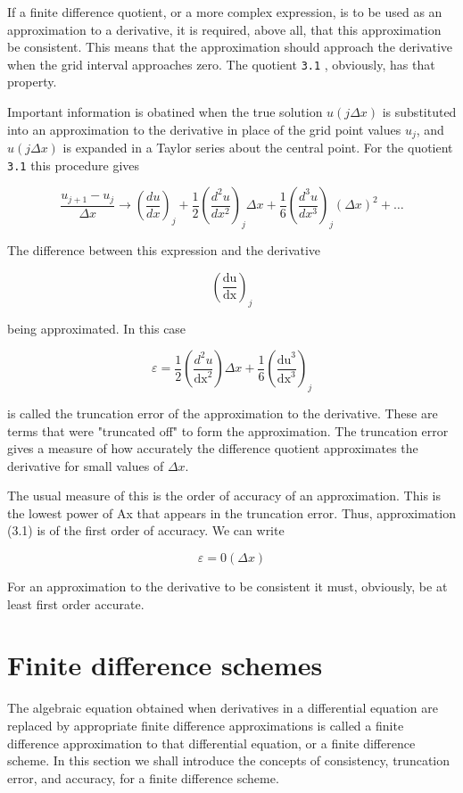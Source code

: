 If a finite difference quotient, or a more complex expression, is to be
used as an approximation to a derivative, it is required, above all,
that this approximation be consistent. This means that the approximation
should approach the derivative when the grid interval approaches zero.
The quotient \texttt{3.1} , obviously, has that property.

Important information is obatined when the true solution
\(u (j\Delta x)\) is substituted into an approximation to the derivative
in place of the grid point values \(u_{j}\), and \(u(j\Delta x)\) is
expanded in a Taylor series about the central point. For the quotient
\texttt{3.1} this procedure gives

\[\frac{u_{j+1} - u_j}{\Delta x} \to \left( \frac{d u}{d x} \right)_j +
\frac{1}{2} \left( \frac{d^2 u}{dx^2} \right)_j \Delta x +
\frac{1}{6} \left( \frac{d^3 u}{dx^3} \right)_j
( \Delta x )^2 + \ldots\]

The difference between this expression and the derivative

\[\left( \frac{\text{du}}{\text{dx}} \right)_{j}\]

being approximated. In this case

\[\varepsilon = \frac{1}{2}\left( \frac{d^{2}u}{\text{dx}^{2}} \right)\Delta x + \frac{1}{6}\left( \frac{\text{du}^{3}}{\text{dx}^{3}} \right)_{j}\]

is called the truncation error of the approximation to the derivative.
These are terms that were "truncated off" to form the approximation. The
truncation error gives a measure of how accurately the difference
quotient approximates the derivative for small values of $\Delta x$.

The usual measure of this is the order of accuracy of an approximation.
This is the lowest power of Ax that appears in the truncation error.
Thus, approximation (3.1) is of the first order of accuracy. We can
write

\[\varepsilon = 0(\Delta x)\]

For an approximation to the derivative to be consistent it must,
obviously, be at least first order accurate.

\section{Finite difference schemes}\label{sec:finite-difference-schemes}

The algebraic equation obtained when derivatives in a differential
equation are replaced by appropriate finite difference approximations is
called a finite difference approximation to that differential equation,
or a finite difference scheme. In this section we shall introduce the
concepts of consistency, truncation error, and accuracy, for a finite
difference scheme.

